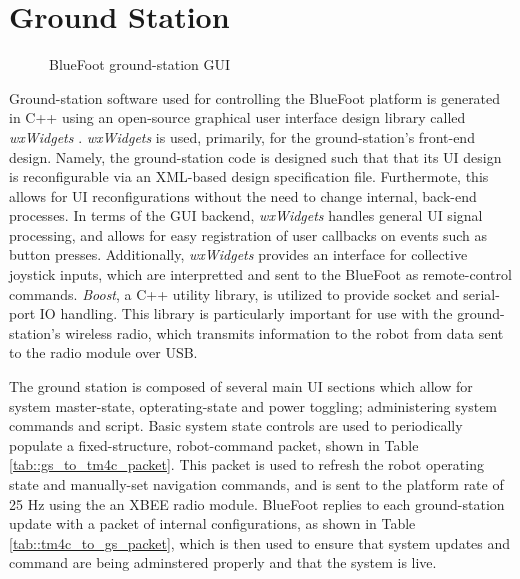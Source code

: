 	\section{Ground Station}
		
		\begin{figure}[h!]
			\centering
			\caption{BlueFoot ground-station GUI}
			\label{fig::comm_flow}
		\end{figure}
	Ground-station software used for controlling the BlueFoot platform is generated in C++ using an open-source graphical user interface design library called \emph{wxWidgets} \cite{WX_Website}. \emph{wxWidgets} is used, primarily, for the ground-station's front-end design. Namely, the ground-station code is designed such that that its UI design is reconfigurable via an XML-based design specification file. Furthermote, this allows for UI reconfigurations without the need to change internal, back-end processes. In terms of the GUI backend, \emph{wxWidgets} handles general UI signal processing, and allows for easy registration of user callbacks on events such as button presses. Additionally, \emph{wxWidgets} provides an interface for collective joystick inputs, which are interpretted and sent to the BlueFoot as remote-control commands. \emph{Boost}, a C++ utility library, is utilized to provide socket and serial-port IO handling. This library is particularly important for use with the ground-station's wireless radio, which transmits information to the robot from data sent to the radio module over USB.  

	 The ground station is composed of several main UI sections which allow for system master-state, opterating-state and power toggling; administering system commands and script. Basic system state controls are used to periodically populate a fixed-structure, robot-command packet, shown in Table \ref{tab::gs_to_tm4c_packet}. This packet is used to refresh the robot operating state and manually-set navigation commands, and is sent to the platform rate of 25 Hz using the an XBEE radio module. BlueFoot replies to each ground-station update with a packet of internal configurations, as shown in Table \ref{tab::tm4c_to_gs_packet}, which is then used to ensure that system updates and command are being adminstered properly and that the system is live.

